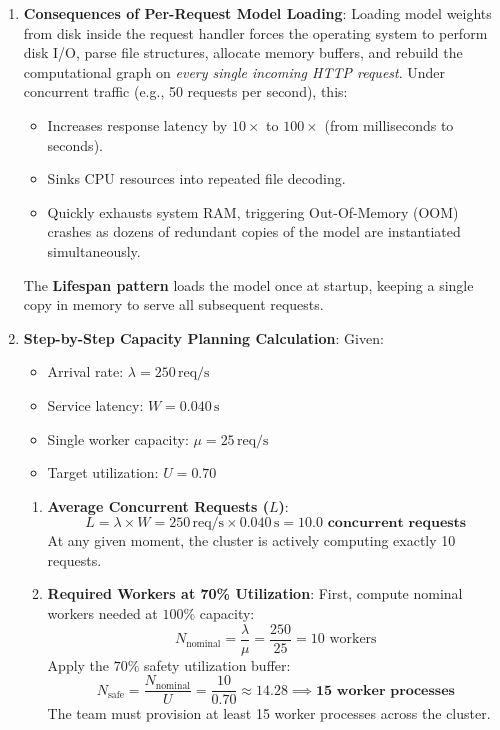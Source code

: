 \begin{enumerate}
    \item \textbf{Consequences of Per-Request Model Loading}:
    Loading model weights from disk inside the request handler forces the operating system to perform disk I/O, parse file structures, allocate memory buffers, and rebuild the computational graph on \emph{every single incoming HTTP request}. Under concurrent traffic (e.g., 50 requests per second), this:
    \begin{itemize}
        \item Increases response latency by $10\times$ to $100\times$ (from milliseconds to seconds).
        \item Sinks CPU resources into repeated file decoding.
        \item Quickly exhausts system RAM, triggering Out-Of-Memory (OOM) crashes as dozens of redundant copies of the model are instantiated simultaneously.
    \end{itemize}
    The \textbf{Lifespan pattern} loads the model once at startup, keeping a single copy in memory to serve all subsequent requests.

    \item \textbf{Step-by-Step Capacity Planning Calculation}:
    Given:
    \begin{itemize}
        \item Arrival rate: $\lambda = 250\,\text{req/s}$
        \item Service latency: $W = 0.040\,\text{s}$
        \item Single worker capacity: $\mu = 25\,\text{req/s}$
        \item Target utilization: $U = 0.70$
    \end{itemize}
    \begin{enumerate}
        \item \textbf{Average Concurrent Requests ($L$)}:
        \begin{equation*}
        L = \lambda \times W = 250\,\text{req/s} \times 0.040\,\text{s} = \mathbf{10.0 \text{ concurrent requests}}
        \end{equation*}
        At any given moment, the cluster is actively computing exactly 10 requests.
        \item \textbf{Required Workers at 70\% Utilization}:
        First, compute nominal workers needed at $100\%$ capacity:
        \begin{equation*}
        N_{\text{nominal}} = \frac{\lambda}{\mu} = \frac{250}{25} = 10 \text{ workers}
        \end{equation*}
        Apply the $70\%$ safety utilization buffer:
        \begin{equation*}
        N_{\text{safe}} = \frac{N_{\text{nominal}}}{U} = \frac{10}{0.70} \approx 14.28 \implies \mathbf{15 \text{ worker processes}}
        \end{equation*}
        The team must provision at least 15 worker processes across the cluster.
    \end{enumerate}


\end{enumerate}
